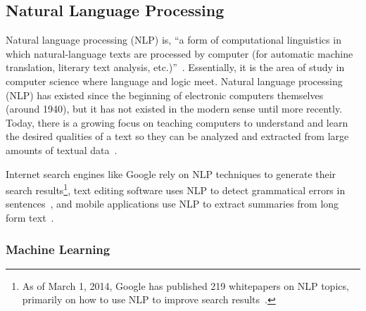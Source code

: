 \subsection{Natural Language Processing}

Natural language processing (NLP) is, ``a form of computational linguistics in which natural-language texts are processed by computer (for automatic machine translation, literary text analysis, etc.)''~\cite{oed-nlp}.
Essentially, it is the area of study in computer science where language and logic meet.
Natural language processing (NLP) has existed since the beginning of electronic computers themselves (around 1940), but it has not existed in the modern sense until more recently.
Today, there is a growing focus on teaching computers to understand and learn the desired qualities of a text so they can be analyzed and extracted from large amounts of textual data~\cite{jurafsky}.

Internet search engines like Google rely on NLP techniques to generate their search results\footnote{As of March 1, 2014, Google has published 219 whitepapers on NLP topics, primarily on how to use NLP to improve search results~\cite{google-nlp}.}, text editing software uses NLP to detect grammatical errors in sentences~\cite{norvig}, and mobile applications use NLP to extract summaries from long form text~\cite{bit-of-news}.

\subsubsection{Machine Learning}

